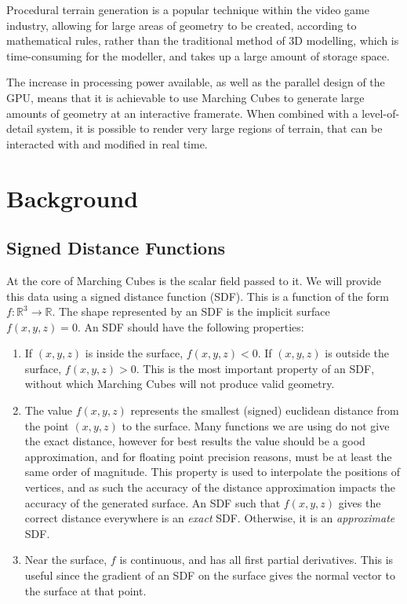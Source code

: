 \documentclass[11pt]{article}
\begin{document}
Procedural terrain generation is a popular technique within the video game industry, allowing for large areas of geometry to be created, according to mathematical rules, rather than the traditional method of 3D modelling, which is time-consuming for the modeller, and takes up a large amount of storage space.

The increase in processing power available, as well as the parallel design of the GPU, means that it is achievable to use Marching Cubes to generate large amounts of geometry at an interactive framerate. When combined with a level-of-detail system, it is possible to render very large regions of terrain, that can be interacted with and modified in real time.

\section{Background}
\subsection{Signed Distance Functions}
\label{section:sdf}
At the core of Marching Cubes is the scalar field passed to it. We will provide this data using a signed distance function (SDF). This is a function of the form $f:\mathbb{R}^3 \rightarrow \mathbb{R}$. The shape represented by an SDF is the implicit surface $f\left(x,y,z\right) = 0$. An SDF should have the following properties:
\begin{enumerate}[label=\roman*.]
\item If $\left(x,y,z\right)$ is inside the surface, $f\left(x,y,z\right) < 0$. If $\left(x,y,z\right)$ is outside the surface, $f\left(x,y,z\right) > 0$. This is the most important property of an SDF, without which Marching Cubes will not produce valid geometry.
\item The value $f\left(x,y,z\right)$ represents the smallest (signed) euclidean distance from the point $\left(x,y,z\right)$ to the surface. Many functions we are using do not give the exact distance, however for best results the value should be a good approximation, and for floating point precision reasons, must be at least the same order of magnitude. This property is used to interpolate the positions of vertices, and as such the accuracy of the distance approximation impacts the accuracy of the generated surface. An SDF such that $f\left(x,y,z\right)$ gives the correct distance everywhere is an \textit{exact} SDF. Otherwise, it is an \textit{approximate} SDF.
\item Near the surface, $f$ is continuous, and has all first partial derivatives. This is useful since the gradient of an SDF on the surface gives the normal vector to the surface at that point.
\end{enumerate}
\end{document}
